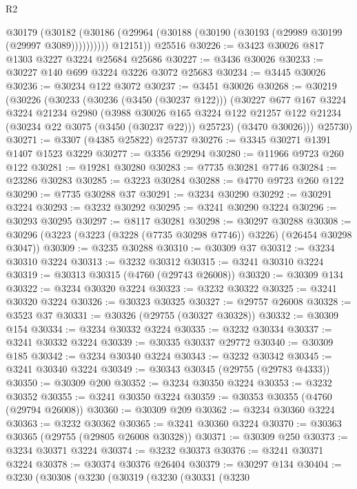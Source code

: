 \begin{lexlean}{R2}
\begin{coremodule}
          @30179
            (@30182 (@30186 (@29964 (@30188 (@30190 (@30193 (@29989 @30199 (@29997 @3089))))))))))
        @12151))
    @25516
@30226 := @3423 @30026 @817 @1303 @3227 @3224 @25684 @25686
@30227 := @3436 @30026
@30233 := @30227 @140 @699 @3224 @3226 @3072 @25683
@30234 := @3445 @30026
@30236 := @30234 @122 @3072
@30237 := @3451 @30026
@30268 := @30219
    (@30226
      (@30233
        (@30236 (@3450 (@30237 @122)))
        (@30227
          @677
          @167
          @3224
          @3224
          @21234
          @2980
          (@3988
            @30026
            @165
            @3224
            @122
            @21257
            @122
            @21234
            (@30234 @22 @3075 (@3450 (@30237 @22)))
            @25723)
          (@3470 @30026)))
      @25730)
@30271 := @3307 (@4385 @25822) @25737
@30276 := @3345 @30271 @1391 @1407 @1523 @3229
@30277 := @3356 @29294
@30280 := @11966 @9723 @260 @122
@30281 := @19281 @30280
@30283 := @7735 @30281 @7746
@30284 := @23286 @30283
@30285 := @3223 @30284
@30288 := @4770 @9723 @260 @122
@30290 := @7735 @30288 @37
@30291 := @3234 @30290
@30292 := @30291 @3224
@30293 := @3232 @30292
@30295 := @3241 @30290 @3224
@30296 := @30293 @30295
@30297 := @8117 @30281
@30298 := @30297 @30288
@30308 := @30296 (@3223 (@3223 (@3228 (@7735 @30298 @7746)) @3226) (@26454 @30298 @3047))
@30309 := @3235 @30288
@30310 := @30309 @37
@30312 := @3234 @30310 @3224
@30313 := @3232 @30312
@30315 := @3241 @30310 @3224
@30319 := @30313 @30315 (@4760 (@29743 @26008))
@30320 := @30309 @134
@30322 := @3234 @30320 @3224
@30323 := @3232 @30322
@30325 := @3241 @30320 @3224
@30326 := @30323 @30325
@30327 := @29757 @26008
@30328 := @3523 @37
@30331 := @30326 (@29755 (@30327 @30328))
@30332 := @30309 @154
@30334 := @3234 @30332 @3224
@30335 := @3232 @30334
@30337 := @3241 @30332 @3224
@30339 := @30335 @30337 @29772
@30340 := @30309 @185
@30342 := @3234 @30340 @3224
@30343 := @3232 @30342
@30345 := @3241 @30340 @3224
@30349 := @30343 @30345 (@29755 (@29783 @4333))
@30350 := @30309 @200
@30352 := @3234 @30350 @3224
@30353 := @3232 @30352
@30355 := @3241 @30350 @3224
@30359 := @30353 @30355 (@4760 (@29794 @26008))
@30360 := @30309 @209
@30362 := @3234 @30360 @3224
@30363 := @3232 @30362
@30365 := @3241 @30360 @3224
@30370 := @30363 @30365 (@29755 (@29805 @26008 @30328))
@30371 := @30309 @250
@30373 := @3234 @30371 @3224
@30374 := @3232 @30373
@30376 := @3241 @30371 @3224
@30378 := @30374 @30376 @26404
@30379 := @30297 @134
@30404 := @3230
    (@30308
      (@3230
        (@30319
          (@3230
            (@30331
              (@3230

\end{coremodule}
\end{lexlean}
